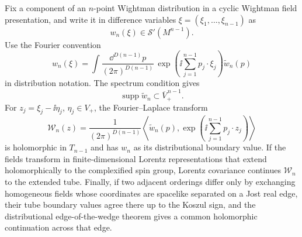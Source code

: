 \begin{proposition}
\label{prop:wightman-tube-boundary-value-package}
Fix a component of an \(n\)-point Wightman distribution in a cyclic Wightman
field presentation, and write it in difference variables
\(\xi=(\xi_1,\ldots,\xi_{n-1})\) as
\[
  w_n(\xi)\in\mathcal S'(M^{n-1}).
\]
Use the Fourier convention
\[
  w_n(\xi)
  =
  \int \frac{\dd^{D(n-1)}p}{(2\pi)^{D(n-1)}}\,
  \exp\!\left(\ii\sum_{j=1}^{n-1}p_j\cdot\xi_j\right)
  \widetilde w_n(p)
\]
in distribution notation.  The spectrum condition gives
\[
  \operatorname{supp}\widetilde w_n
  \subset \overline V_+^{\,n-1}.
\]
For \(z_j=\xi_j-\ii\eta_j\), \(\eta_j\in V_+\), the Fourier--Laplace
transform
\[
  \mathcal W_n(z)
  =
  \frac{1}{(2\pi)^{D(n-1)}}
  \left\langle \widetilde w_n(p),
  \exp\!\left(\ii\sum_{j=1}^{n-1}p_j\cdot z_j\right)\right\rangle
\]
is holomorphic in \(T_{n-1}\) and has \(w_n\) as its distributional boundary
value.  If the fields transform in finite-dimensional Lorentz
representations that extend holomorphically to the complexified spin group,
Lorentz covariance continues \(\mathcal W_n\) to the extended tube.  Finally,
if two adjacent orderings differ only by exchanging homogeneous fields whose
coordinates are spacelike separated on a Jost real edge, their tube boundary
values agree there up to the Koszul sign, and the distributional
edge-of-the-wedge theorem gives a common holomorphic continuation across that
edge.
\end{proposition}

